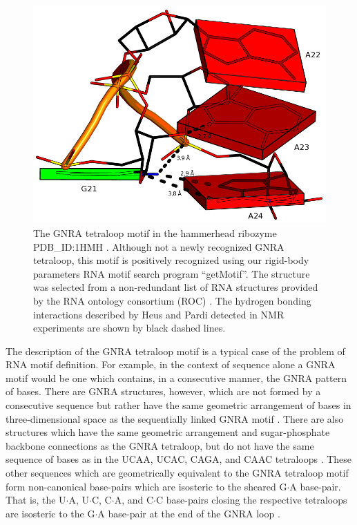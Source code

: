\begin{figure}
\centering
\includegraphics[angle=0, scale=0.38]{Chapter5/gnra21L2.png}
\caption{The   GNRA  tetraloop  motif   in  the   hammerhead  ribozyme
  PDB\_ID:1HMH \cite{pley1994}.  Although  not a newly recognized GNRA
  tetraloop, this motif is  positively recognized using our rigid-body
  parameters RNA motif search  program ``getMotif''. The structure was
  selected from a non-redundant list of RNA structures provided by the
  RNA  ontology consortium  (ROC)  \cite{leontis2006b}.  The  hydrogen
  bonding  interactions described  by Heus  and  Pardi \cite{heus1991}
  detected in NMR experiments are shown by black dashed lines.}
\label{fig:gnrablocks}
\end{figure}

The description of  the GNRA tetraloop motif is a  typical case of the
problem  of RNA  motif definition.   For  example, in  the context  of
sequence  alone  a  GNRA motif  would  be  one  which contains,  in  a
consecutive  manner,  the  GNRA  pattern  of bases.   There  are  GNRA
structures, however,  which are not  formed by a  consecutive sequence
but  rather   have  the  same   geometric  arrangement  of   bases  in
three-dimensional  space   as  the  sequentially   linked  GNRA  motif
\cite{lee2003, lemieux2006}.  There are also structures which have the
same geometric arrangement and sugar-phosphate backbone connections as
the GNRA tetraloop,  but do not have the same sequence  of bases as in
the UCAA,  UCAC, CAGA, and CAAC  tetraloops \cite{lemieux2006}.  These
other  sequences  which  are  geometrically  equivalent  to  the  GNRA
tetraloop motif  form non-canonical base-pairs which  are isosteric to
the sheared  G$\cdot$A base-pair.  That is, the  U$\cdot$A, U$\cdot$C,
C$\cdot$A, and C$\cdot$C  base-pairs closing the respective tetraloops
are isosteric to  the G$\cdot$A base-pair at the end  of the GNRA loop
\cite{lemieux2006}.

